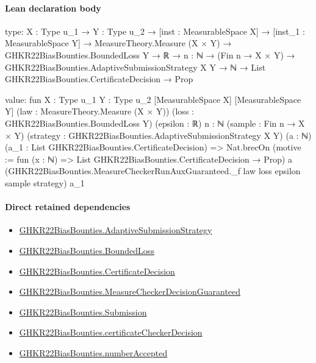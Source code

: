 \documentclass[10pt]{article}
\begin{document}
\paragraph{Lean declaration body}
\begin{ReviewVerbatim}
type:
{X : Type u_1} →
  {Y : Type u_2} →
    [inst : MeasurableSpace X] →
      [inst_1 : MeasurableSpace Y] →
        MeasureTheory.Measure (X × Y) →
          GHKR22BiasBounties.BoundedLoss Y →
            ℝ →
              {n : ℕ} →
                (Fin n → X × Y) →
                  GHKR22BiasBounties.AdaptiveSubmissionStrategy X Y →
                    ℕ → List GHKR22BiasBounties.CertificateDecision → Prop

value:
fun {X : Type u_1} {Y : Type u_2} [MeasurableSpace X] [MeasurableSpace Y] (law : MeasureTheory.Measure (X × Y))
    (loss : GHKR22BiasBounties.BoundedLoss Y) (epsilon : ℝ) {n : ℕ} (sample : Fin n → X × Y)
    (strategy : GHKR22BiasBounties.AdaptiveSubmissionStrategy X Y) (a : ℕ)
    (a_1 : List GHKR22BiasBounties.CertificateDecision) =>
  Nat.brecOn (motive := fun (x : ℕ) => List GHKR22BiasBounties.CertificateDecision → Prop) a
    (GHKR22BiasBounties.MeasureCheckerRunAuxGuaranteed._f law loss epsilon sample strategy) a_1
\end{ReviewVerbatim}

\paragraph{Direct retained dependencies}
\begin{itemize}\raggedright
\item \hyperlink{governing-declaration-28f1bb71fd1d4b66}{GHKR22\allowbreak{}Bias\allowbreak{}Bounties.\allowbreak{}Adaptive\allowbreak{}Submission\allowbreak{}Strategy}
\item \hyperlink{paper-prerequisite-ef6c319b0770dad4}{GHKR22\allowbreak{}Bias\allowbreak{}Bounties.\allowbreak{}Bounded\allowbreak{}Loss}
\item \hyperlink{governing-declaration-7881732e3fc3c15e}{GHKR22\allowbreak{}Bias\allowbreak{}Bounties.\allowbreak{}Certificate\allowbreak{}Decision}
\item \hyperlink{governing-declaration-1ea5569f12977b0e}{GHKR22\allowbreak{}Bias\allowbreak{}Bounties.\allowbreak{}Measure\allowbreak{}Checker\allowbreak{}Decision\allowbreak{}Guaranteed}
\item \hyperlink{governing-declaration-e9890aa090ac9d70}{GHKR22\allowbreak{}Bias\allowbreak{}Bounties.\allowbreak{}Submission}
\item \hyperlink{paper-prerequisite-f66f083361731baf}{GHKR22\allowbreak{}Bias\allowbreak{}Bounties.\allowbreak{}certificate\allowbreak{}Checker\allowbreak{}Decision}
\item \hyperlink{governing-declaration-c0f7f39e9b64efda}{GHKR22\allowbreak{}Bias\allowbreak{}Bounties.\allowbreak{}number\allowbreak{}Accepted}
\end{itemize}
\hypertarget{governing-declaration-f8541951a595d742}{}
\end{document}
